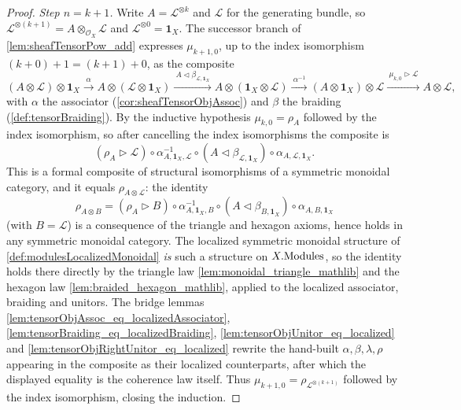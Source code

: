 \begin{proof}
  \emph{Step \(n = k+1\).} Write \(A = \mathcal{L}^{\otimes k}\) and
  \(\mathcal{L}\) for the generating bundle, so
  \(\mathcal{L}^{\otimes (k+1)} = A \otimes_{\mathcal{O}_X} \mathcal{L}\) and
  \(\mathcal{L}^{\otimes 0} = \mathbf{1}_X\). The successor branch of
  \cref{lem:sheafTensorPow_add} expresses \(\mu_{k+1,0}\), up to the index
  isomorphism \((k+0)+1 = (k+1)+0\), as the composite
  \[
    (A \otimes \mathcal{L}) \otimes \mathbf{1}_X
      \xrightarrow{\ \alpha\ }
      A \otimes (\mathcal{L} \otimes \mathbf{1}_X)
      \xrightarrow{\ A \lhd \beta_{\mathcal{L},\mathbf{1}_X}\ }
      A \otimes (\mathbf{1}_X \otimes \mathcal{L})
      \xrightarrow{\ \alpha^{-1}\ }
      (A \otimes \mathbf{1}_X) \otimes \mathcal{L}
      \xrightarrow{\ \mu_{k,0} \rhd \mathcal{L}\ }
      A \otimes \mathcal{L},
  \]
  with \(\alpha\) the associator (\cref{cor:sheafTensorObjAssoc}) and \(\beta\) the
  braiding (\cref{def:tensorBraiding}). By the inductive hypothesis
  \(\mu_{k,0} = \rho_A\) followed by the index isomorphism, so after cancelling
  the index isomorphisms the composite is
  \[
    (\rho_A \rhd \mathcal{L}) \circ \alpha^{-1}_{A,\mathbf{1}_X,\mathcal{L}}
      \circ (A \lhd \beta_{\mathcal{L},\mathbf{1}_X})
      \circ \alpha_{A,\mathcal{L},\mathbf{1}_X}.
  \]
  This is a formal composite of structural isomorphisms of a symmetric monoidal
  category, and it equals \(\rho_{A \otimes \mathcal{L}}\): the identity
  \[
    \rho_{A \otimes B}
      = (\rho_A \rhd B) \circ \alpha^{-1}_{A,\mathbf{1}_X,B}
        \circ (A \lhd \beta_{B,\mathbf{1}_X})
        \circ \alpha_{A,B,\mathbf{1}_X}
  \]
  (with \(B = \mathcal{L}\)) is a consequence of the triangle and hexagon axioms,
  hence holds in any symmetric monoidal category. The localized symmetric monoidal
  structure of \cref{def:modulesLocalizedMonoidal} \emph{is} such a structure on
  \(X.\mathrm{Modules}\), so the identity holds there directly by the triangle law
  \cref{lem:monoidal_triangle_mathlib} and the hexagon law
  \cref{lem:braided_hexagon_mathlib}, applied to the localized associator, braiding
  and unitors. The bridge lemmas \cref{lem:tensorObjAssoc_eq_localizedAssociator},
  \cref{lem:tensorBraiding_eq_localizedBraiding},
  \cref{lem:tensorObjUnitor_eq_localized} and
  \cref{lem:tensorObjRightUnitor_eq_localized} rewrite the hand-built
  \(\alpha, \beta, \lambda, \rho\) appearing in the composite as their localized
  counterparts, after which the displayed equality is the coherence law itself.
  Thus \(\mu_{k+1,0} = \rho_{\mathcal{L}^{\otimes (k+1)}}\) followed by the index
  isomorphism, closing the induction.
\end{proof}

